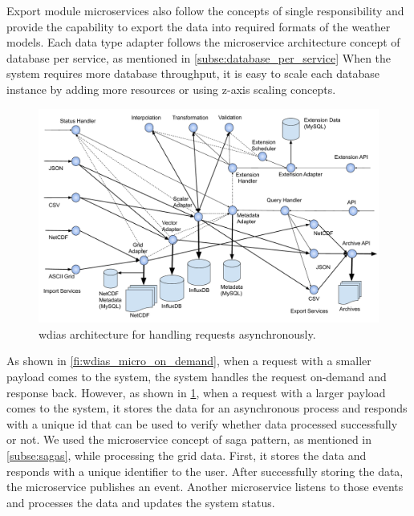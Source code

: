 Export module microservices also follow the concepts of single responsibility and provide the capability to export the data into required formats of the weather models. Each data type adapter follows the microservice architecture concept of database per service, as mentioned in \cref{subse:database_per_service} When the system requires more database throughput, it is easy to scale each database instance by adding more resources or using z-axis scaling concepts.

\begin{figure}[htp]
    \centering
    \includegraphics[width=1\textwidth]{method/microservice/microservice_architecture-handle_on_async-v4.pdf}
    \caption{\acrshort{wdias} architecture for handling requests asynchronously.}
    \label{fi:wdias_micro_async}
\end{figure}

As shown in \cref{fi:wdias_micro_on_demand}, when a request with a smaller payload comes to the system, the system handles the request on-demand and response back. However, as shown in \cref{fi:wdias_micro_async}, when a request with a larger payload comes to the system, it stores the data for an asynchronous process and responds with a unique id that can be used to verify whether data processed successfully or not. We used the microservice concept of saga pattern, as mentioned in \cref{subse:sagas}, while processing the grid data. First, it stores the data and responds with a unique identifier to the user. After successfully storing the data, the microservice publishes an event. Another microservice listens to those events and processes the data and updates the system status.

